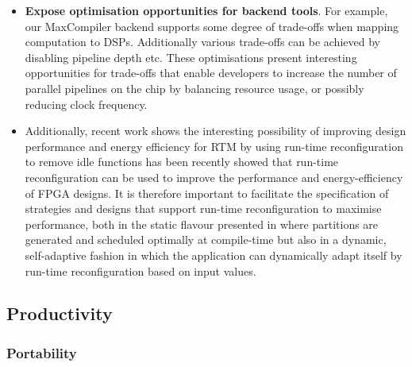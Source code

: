 \begin{itemize}
\item \textbf{Expose optimisation opportunities for backend
  tools}. For example, our MaxCompiler backend supports some degree of
  trade-offs when mapping computation to DSPs. Additionally various
  trade-offs can be achieved by disabling pipeline depth etc.  These
  optimisations present interesting opportunities for trade-offs that
  enable developers to increase the number of parallel pipelines on
  the chip by balancing resource usage, or possibly reducing clock
  frequency.

\item Additionally, recent work shows the interesting possibility of
  improving design performance and energy efficiency for RTM by using
  run-time reconfiguration to remove idle functions has been recently
  showed that run-time reconfiguration can be used to improve the
  performance and energy-efficiency of FPGA designs. It is therefore
  important to facilitate the specification of strategies and designs
  that support run-time reconfiguration to maximise performance, both
  in the static flavour presented in
  \cite{Xinyu:Qiwei:Luk:Qiang:Pell:2012} where partitions are
  generated and scheduled optimally at compile-time but also in a
  dynamic, self-adaptive fashion \cite{6322875} in which the
  application can dynamically adapt itself by run-time reconfiguration
  based on input values.

\end{itemize}


\subsection{Productivity}

\subsubsection{Portability}

